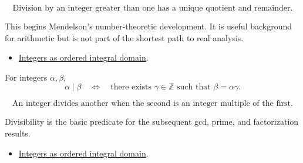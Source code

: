 \begin{remark*}
\[
  \text{Division by an integer greater than one has a unique quotient and
  remainder.}
\]
\end{remark*}

\begin{remark*}[Interpretation]
This begins Mendelson's number-theoretic development. It is useful background
for arithmetic but is not part of the shortest path to real analysis.
\end{remark*}

\begin{dependencies}
\begin{itemize}
  \item \hyperref[cor:men-integers-ordered-integral-domain]{Integers as ordered integral domain}.
\end{itemize}
\end{dependencies}

\begin{definition}
\label{def:men-divisibility}
For integers \(\alpha,\beta\),
\[
  \alpha\mid\beta
  \quad\Longleftrightarrow\quad
  \text{there exists }\gamma\in\mathbb{Z}\text{ such that }\beta=\alpha\gamma.
\]
\end{definition}

\begin{remark*}
\[
  \text{An integer divides another when the second is an integer multiple of
  the first.}
\]
\end{remark*}

\begin{remark*}[Interpretation]
Divisibility is the basic predicate for the subsequent gcd, prime, and
factorization results.
\end{remark*}

\begin{dependencies}
\begin{itemize}
  \item \hyperref[cor:men-integers-ordered-integral-domain]{Integers as ordered integral domain}.
\end{itemize}
\end{dependencies}

